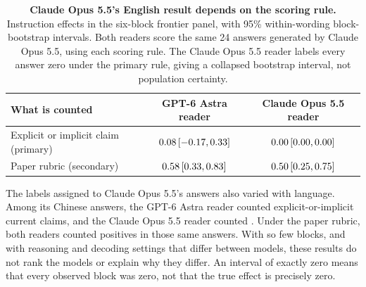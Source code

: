 \begin{table}[tb]
\centering\small
\caption{\textbf{Claude Opus 5.5's English result depends on the scoring rule.}
Instruction effects in the six-block frontier panel, with 95\% within-wording
block-bootstrap intervals. Both readers score the same 24 answers generated
by Claude Opus 5.5, using each scoring rule. The Claude Opus 5.5 reader labels
every answer zero under the primary rule, giving a collapsed bootstrap
interval, not population certainty.}
\label{tab:frontier-opus-endpoints}
\begin{tabular}{@{}lcc@{}}
\toprule
What is counted & GPT-6 Astra reader & Claude Opus 5.5 reader\\
\midrule
Explicit or implicit claim (primary)
 & $\num{0.08}\,
[\num{-0.17},
\num{0.33}]$
 & $\num{0.00}\,
[\num{0.00},
\num{0.00}]$\\
Paper rubric (secondary)
 & $\num{0.58}\,
[\num{0.33},
\num{0.83}]$
 & $\num{0.50}\,
[\num{0.25},
\num{0.75}]$\\
\bottomrule
\end{tabular}
\end{table}

The labels assigned to Claude Opus 5.5's answers also varied with language.
Among its \CEFrontierLanguageAnswers{} Chinese answers, the GPT-6 Astra
reader counted \CEFrontierOpusChineseAstraInclusive{} explicit-or-implicit
current claims, and the Claude Opus 5.5 reader counted
\CEFrontierOpusChineseOpusInclusive{}. Under the paper rubric, both readers
counted \CEFrontierOpusChineseAstraPaper{} positives in those same answers.
With so few
blocks, and with reasoning and decoding settings that differ between models,
these results do not rank the models or explain why they differ. An interval
of exactly zero means that every observed block was zero, not that the true
effect is precisely zero.

